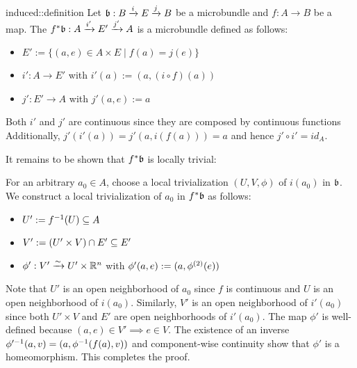 \begin{mydefinition}{induced::definition}
    Let $\bb: \bundle{B}{E}{i}{j}$ be a microbundle and $f: A \to B$ be a map.
    The  $\bundledef{\ind{f}\bb}{A}{E'}{i'}{j'}$ is a microbundle defined as follows:
    \begin{itemize}
        \item $E' := \{ (a, e) \in A \times E \mid f(a) = j(e) \}$
        \item $i': A \to E'$ with $i'(a) := (a, (i \circ f)(a))$
        \item $j': E' \to A$ with $j'(a, e) := a$
    \end{itemize}
\end{mydefinition}

\begin{myproof}
    Both $i'$ and $j'$ are continuous since they are composed by continuous functions
    Additionally, $j'(i'(a)) = j'(a, i(f(a))) = a$ and hence $j' \circ i' = id_A$.

    It remains to be shown that $\ind{f}\bb$ is locally trivial:

    For an arbitrary $a_0 \in A$, choose a local trivialization $(U, V, \phi)$ of $i(a_0)$ in $\bb$.
    We construct a local trivialization of $a_0$ in $\ind{f}\bb$ as follows:
    \begin{itemize}
        \item $U' := \inv{f}(U) \sub A$
        \item $V' := (U' \times V) \cap E' \sub E'$
        \item $\phi': V' \isomto U' \times \R^n$ with $\phi'(a, e) := (a, \snd{\phi}(e))$
    \end{itemize}
    Note that $U'$ is an open neighborhood of $a_0$ since $f$ is continuous and $U$ is an open neighborhood of $i(a_0)$.
    Similarly, $V'$ is an open neighborhood of $i'(a_0)$ since both $U' \times V$ and $E'$ are open neighborhoods of $i'(a_0)$.
    The map $\phi'$ is well-defined because $(a, e) \in V' \implies e \in V$.
    The existence of an inverse $\inv{\phi'}(a, v) = (a, \inv{\phi}(f(a), v))$ and component-wise continuity show that $\phi'$ is a homeomorphism.
    This completes the proof. 
\end{myproof}
